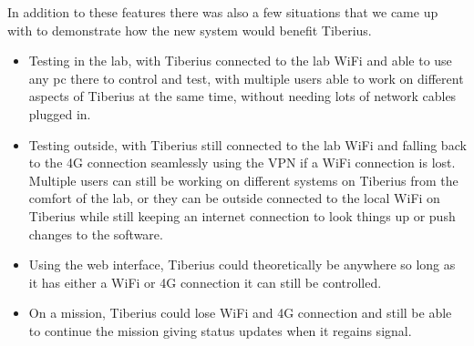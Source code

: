 In addition to these features there was also a few situations that we came up with to demonstrate how the new system would benefit Tiberius.

\begin{itemize}

\item Testing in the lab, with Tiberius connected to the lab WiFi and able to use any pc there to control and test, with multiple users able to work on different aspects of Tiberius at the same time, without needing lots of network cables plugged in.




\item Testing outside, with Tiberius still connected to the lab WiFi and falling back to the 4G connection seamlessly using the VPN if a WiFi connection is lost. Multiple users can still be working on different systems on Tiberius from the comfort of the lab, or they can be outside connected to the local WiFi on Tiberius while still keeping an internet connection to look things up or push changes to the software.



\item Using the web interface, Tiberius could theoretically be anywhere so long as it has either a WiFi or 4G connection it can still be controlled.



\item On a mission, Tiberius could lose WiFi and 4G connection and still be able to continue the mission giving status updates when it regains signal.



\end{itemize}



